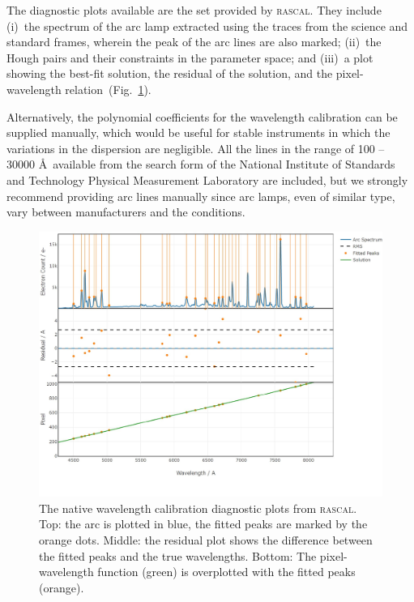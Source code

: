 \documentclass[linenumbers, twocolumn]{aastex631}
\begin{document}
The diagnostic plots available are the set provided by \textsc{rascal}.
They include (i)~the spectrum of the arc lamp extracted using the traces from
the science and standard frames, wherein the peak of the arc lines are also marked;
(ii)~the Hough pairs and their constraints in the parameter space;
and (iii)~a plot showing the best-fit solution, the residual of the solution,
and the pixel-wavelength relation~(Fig.~\ref{fig:wavecal}).


Alternatively, the polynomial coefficients for the wavelength calibration can be
supplied manually, which would be useful for stable instruments in which the
variations in the dispersion are negligible. All the lines in the
range of 100 -- 30000 \AA\ 
available from the search form of the National Institute of Standards and
Technology Physical Measurement Laboratory are included, but we strongly
recommend providing arc lines manually since arc lamps, even of similar type,
vary between manufacturers and the conditions.

\begin{figure}
    \centering
    \includegraphics[width=\columnwidth]{fig_05_wavelength_calibration_diagnostics.pdf}
    \caption{The native wavelength calibration diagnostic plots from \textsc{rascal}.
    Top: the arc is plotted in blue, the fitted peaks are marked by
    the orange dots. Middle: the residual plot shows the difference
    between the fitted peaks and the true wavelengths. Bottom: The
    pixel-wavelength function (green) is overplotted with the fitted
    peaks (orange).}
    \label{fig:wavecal}
\end{figure}
\end{document}
